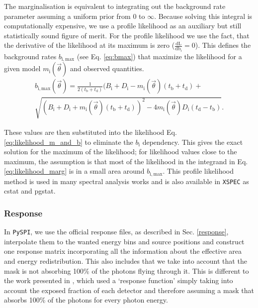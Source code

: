 \documentclass[twocolumn,traditabstract]{aa}
\begin{document}
\noindent
The marginalisation is equivalent to integrating out the background rate parameter assuming a uniform prior from 0 to $\infty$. Because solving this integral is computationally expensive, we use a profile likelihood as an auxiliary but still statistically sound figure of merit. For the profile likelihood we use the fact, that the derivative of the likelihood at its maximum is zero ($\frac{\textrm{dL}}{\textrm{db}_i}=0$). This defines the background rates $b_\mathrm{{i, max}}$ (see Eq. \ref{eq:bmax}) that maximize the likelihood for a given model $m_{\mathrm{i}}(\vec{\theta})$ and observed quantities.
\begin{multline}
	b_{\mathrm{i,max}}(\vec{\theta})=\frac{1}{2(t_{\mathrm{b}}+t_{\mathrm{d}})}(B_{\mathrm{i}}+D_{\mathrm{i}}-m_{\mathrm{i}}(\vec{\theta})(t_{\mathrm{b}}+t_{\mathrm{d}})+\\
  \sqrt{(B_{\mathrm{i}}+D_{\mathrm{i}}+m_{\mathrm{i}}(\vec{\theta})(t_{\mathrm{b}}+t_{\mathrm{d}}))^{2}-4m_{\mathrm{i}}(\vec{\theta})D_{\mathrm{i}}(t_{\mathrm{d}}-t_{\mathrm{b}})}.
  \label{eq:bmax}
\end{multline}

\noindent
These values are then substituted into the likelihood Eq. \ref{eq:likelihood_m_and_b} to eliminate the $b_{\mathrm{i}}$ dependency. This gives the exact solution for the maximum of the likelihood; for likelihood values close to the maximum, the assumption is that most of the likelihood in the integrand in Eq. \ref{eq:likelihood_marg} is in a small area around $b_{\mathrm{i,max}}$.
This profile likelihood method is used in many spectral analysis works \citep[e.g.][]{profile2, profile1} and is also available in {\tt XSPEC} \citep{xspec} as cstat and pgstat.

\subsubsection{Response}

In {\tt PySPI}, we use the official response files, as described in Sec. \ref{response}, interpolate them to the wanted energy bins and source positions and construct one response matrix incorporating all the information about the effective area and energy redistribution. This also includes that we take into account that the mask is not absorbing 100\% of the photons flying through it. This is different to the work presented in \citet{Bosnjak-2014}, which used a `response function' simply taking into account the exposed fraction of each detector and therefore assuming a mask that absorbs 100\% of the photons for every photon energy.
\end{document}
